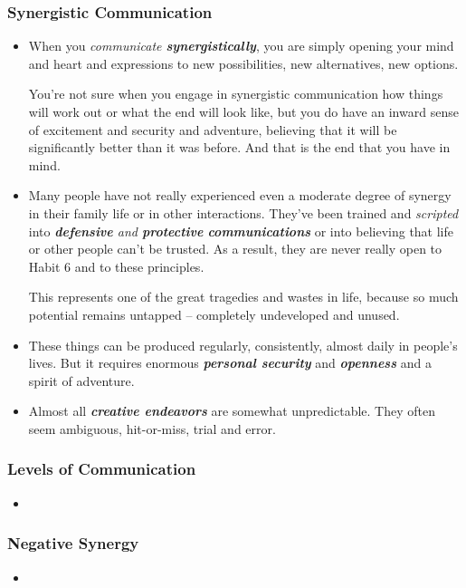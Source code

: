 \documentclass[11pt]{article}
\begin{document}
\subsubsection{Synergistic Communication}
\begin{itemize}
\item When you \emph{communicate \textbf{synergistically}}, you are simply opening your mind and heart and expressions to new possibilities, new alternatives, new options.

You're not sure when you engage in synergistic communication how things will work out or what the end will look like, but you do have an inward sense of excitement and security and adventure, believing that it will be significantly better than it was before. And that is the end that you have in mind.

\item Many people have not really experienced even a moderate degree of synergy in their family life or in other interactions. They've been trained and \emph{scripted} into \emph{\textbf{defensive} and \textbf{protective} \textbf{communications}} or into believing that life or other people can't be trusted. As a result, they are never really open to Habit 6 and to these principles.

This represents one of the great tragedies and wastes in life, because so much potential remains untapped -- completely undeveloped and unused.

\item These things can be produced regularly, consistently, almost daily in people's lives. But it requires enormous \emph{\textbf{personal security}} and \emph{\textbf{openness}} and a spirit of adventure.

\item Almost all \emph{\textbf{creative endeavors}} are somewhat unpredictable. They often seem ambiguous, hit-or-miss, trial and error. 
\end{itemize}
\subsubsection{Levels of Communication}
\begin{itemize}
\item 
\end{itemize}
\subsubsection{Negative Synergy}
\begin{itemize}
\item 
\end{itemize}
\end{document}
